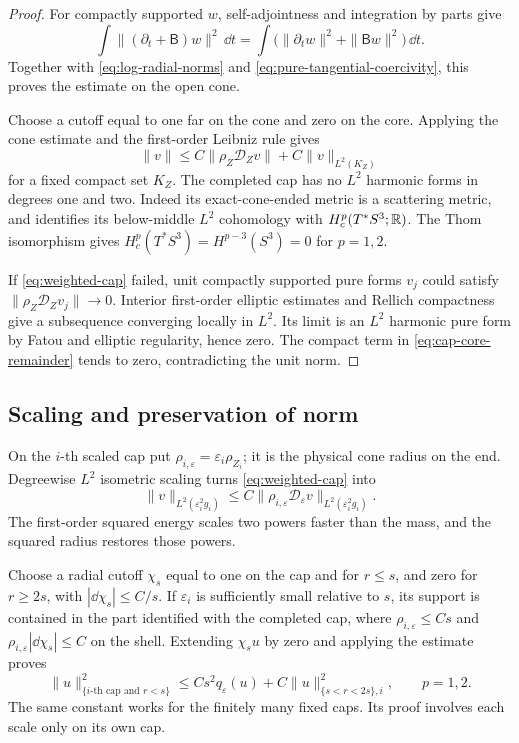 \begin{proof}
For compactly supported $w$, self-adjointness and integration by
parts give
\[
 \int\|(\partial_t+\mathsf B)w\|^2\,\dd t
       =\int\bigl(\|\partial_tw\|^2+\|\mathsf Bw\|^2\bigr)\,\dd t.
\]
Together with \eqref{eq:log-radial-norms} and
\eqref{eq:pure-tangential-coercivity}, this proves the estimate on
the open cone.

Choose a cutoff equal to one far on the cone and zero on the core.
Applying the cone estimate and the first-order Leibniz rule gives
\begin{equation}\label{eq:cap-core-remainder}
 \|v\|\le C\|\rho_Z\mathcal D_Zv\|+C\|v\|_{L^2(K_Z)}
\end{equation}
for a fixed compact set $K_Z$. The completed cap has no $L^2$
harmonic forms in degrees one and two. Indeed its exact-cone-ended
metric is a scattering metric, and
\cite[Theorem~1A]{hausel-hunsicker-mazzeo} identifies its below-middle
$L^2$ cohomology with $H_c^p(T^*S^3;\mathbb R)$. The Thom isomorphism
gives $H_c^p(T^*S^3)=H^{p-3}(S^3)=0$ for $p=1,2$.

If \eqref{eq:weighted-cap} failed, unit compactly supported pure
forms $v_j$ could satisfy $\|\rho_Z\mathcal D_Zv_j\|\to0$.
Interior first-order elliptic estimates and Rellich compactness
give a subsequence converging locally in $L^2$. Its limit is an
$L^2$ harmonic pure form by Fatou and elliptic regularity, hence
zero. The compact term in \eqref{eq:cap-core-remainder} tends to
zero, contradicting the unit norm.
\end{proof}

\subsection{Scaling and preservation of norm}

On the $i$-th scaled cap put
$\rho_{i,\varepsilon}=\varepsilon_i\rho_{Z_i}$; it is the physical
cone radius on the end. Degreewise $L^2$ isometric scaling turns
\eqref{eq:weighted-cap} into
\[
 \|v\|_{L^2(\varepsilon_i^2g_i)}
       \le C\|\rho_{i,\varepsilon}
                    \mathcal D_\varepsilon v\|_{L^2(\varepsilon_i^2g_i)}.
\]
The first-order squared energy scales two powers faster than the mass,
and the squared radius restores those powers.

Choose a radial cutoff $\chi_s$ equal to one on the cap and for
$r\le s$, and zero for $r\ge2s$, with
$|\dd\chi_s|\le C/s$. If $\varepsilon_i$ is sufficiently small
relative to $s$, its support is contained in the part identified with
the completed cap, where
$\rho_{i,\varepsilon}\le Cs$ and
$\rho_{i,\varepsilon}|\dd\chi_s|\le C$ on the shell. Extending
$\chi_su$ by zero and applying the estimate proves
\begin{equation}\label{eq:cap-tail}
 \|u\|^2_{\{i\text{-th cap and }r<s\}}
       \le Cs^2q_\varepsilon(u)
          +C\|u\|^2_{\{s<r<2s\},i},\qquad p=1,2.
\end{equation}
The same constant works for the finitely many fixed caps. Its proof
involves each scale only on its own cap.

